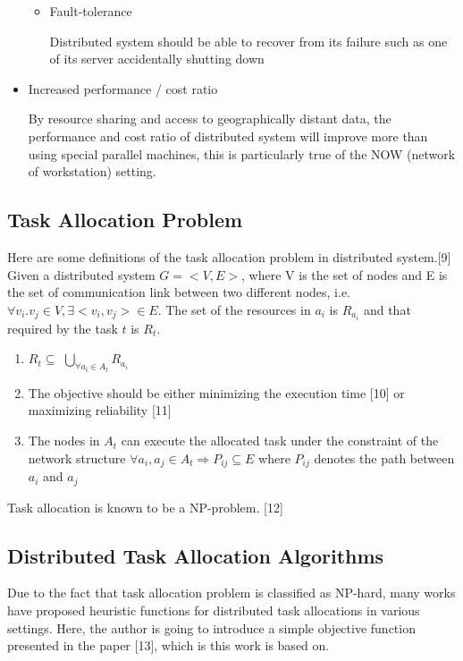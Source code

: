 \begin{itemize}
\begin{itemize}
      	\item{Fault-tolerance}
	
	Distributed system should be able to recover from its failure such as one of its server accidentally shutting down
	
    \end{itemize}
    
    
   \item{Increased performance / cost ratio}
   
     By resource sharing and access to geographically distant data, the performance and cost ratio of distributed system will improve more than using special parallel machines, this is particularly true of the NOW (network of workstation) setting.
     
\end{itemize}

\subsection{Task Allocation Problem}

Here are some definitions of the task allocation problem in distributed system.[9]
Given a distributed system $G = <V, E>$, where V is the set of nodes and E is the set of communication link between two different nodes, i.e. $\forall v_i. v_j \in V, \exists <v_i, v_j> \in E$.  The set of the resources in $a_i$ is $R_{a_i}$ and that required by the task $t$ is $R_t$.

\begin{enumerate}
	\item{$R_t \subseteq$ $\bigcup_{\forall a_i \in A_t} R_{a_i}$}
	\item{The objective should be either minimizing the execution time [10] or maximizing reliability [11]}
	\item{The nodes in $A_t$ can execute the allocated task under the constraint of the network structure $\forall a_i, a_j \in A_t \Rightarrow P_{ij} \subseteq E$ where $P_{ij}$ denotes the path between $a_i$ and $a_j$}
\end{enumerate}

Task allocation is known to be a NP-problem. [12]

\subsection{Distributed Task Allocation Algorithms}

Due to the fact that task allocation problem is classified as NP-hard, many works have proposed heuristic functions for distributed task allocations in various settings.  Here, the author is going to introduce a simple objective function presented in the paper [13], which is this work is based on.

